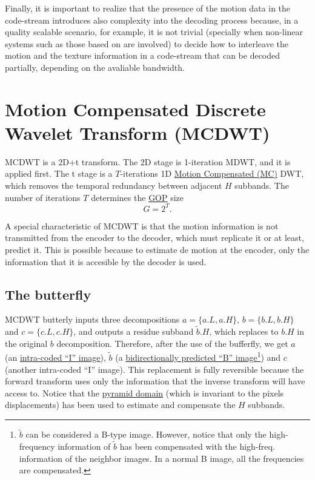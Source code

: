 Finally, it is important to realize that the presence of the motion
data in the code-stream introduces also complexity into the decoding
process because, in a quality scalable scenario, for example, it is
not trivial (specially when non-linear systems such as those based on
 are involved) to decide how to
interleave the motion and the texture information in a code-stream
that can be decoded partially, depending on the avaliable bandwidth.


\section{Motion Compensated Discrete Wavelet Transform (MCDWT)}
MCDWT is a 2D+t transform. The 2D stage is 1-iteration MDWT, and it is
applied first. The t stage is a $T$-iterations 1D
\href{https://en.wikipedia.org/wiki/Motion_compensation}{Motion
  Compensated (MC)} DWT, which removes the temporal redundancy between
adjacent $H$ subbands. The number of iterations $T$ determines the
\href{https://en.wikipedia.org/wiki/Group_of_pictures}{GOP} size
\begin{equation}
  G=2^T.
  \label{eq:GOP_size}
\end{equation}

A special characteristic of MCDWT is that the motion information is
not transmitted from the encoder to the decoder, which must replicate
it or at least, predict it. This is possible because to estimate de
motion at the encoder, only the information that it is accesible by
the decoder is used.

\subsection{The butterfly}
MCDWT butterly inputs three decompositions $a=\{a.L, a.H\}$, $b=\{b.L,
b.H\}$ and $c=\{c.L, c.H\}$, and outputs a residue subband
$\tilde{b}.H$, which replaces to $b.H$ in the original $b$
decomposition. Therefore, after the use of the bufferfly,
we get $a$ (an
\href{https://en.wikipedia.org/wiki/Video_compression_picture_types}{intra-coded
  ``I'' image}), $\tilde{b}$ (a
\href{https://en.wikipedia.org/wiki/Video_compression_picture_types}{bidirectionally
  predicted ``B'' image}\footnote{$\tilde{b}$ can be considered a
  B-type image. However, notice that only the high-frequency
  information of $\tilde{b}$ has been compensated with the
  high-freq. information of the neighbor images. In a normal B image,
  all the frequencies are compensated.}) and $c$ (another intra-coded
``I'' image). This replacement is fully reversible because the forward
transform uses only the information that the inverse transform will
have access to. Notice that the
\href{http://www.vtvt.ece.vt.edu/research/references/video/DCT_Video_Compression/Zhang92a.pdf}{pyramid
  domain} (which is invariant to the pixels displacements) has been
used to estimate and compensate the $H$ subbands.

